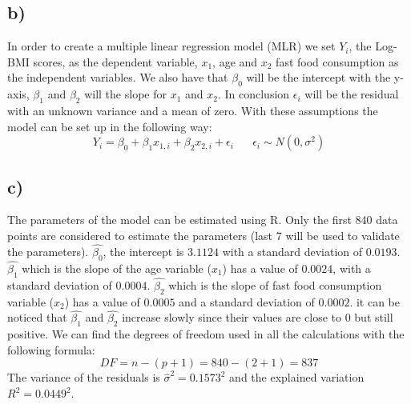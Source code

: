 \begin{figure}[ht!]
\begin{minipage}{.5\textwidth}
  \label{ScatLogFast}
\end{minipage}
\end{figure}

\subsection{b)}
In order to create a multiple linear regression model (MLR)
we set $Y_i$, the Log-BMI scores, as the dependent variable, $x_1$, age and $x_2$ fast food consumption as the independent variables. We also have that $\beta_0$ will be the intercept with the y-axis, $\beta_1$ and $\beta_2$ will the slope for $x_1$ and $x_2$. In conclusion $\epsilon_i$ will be the residual with an unknown variance and a mean of zero. With these assumptions the model can be set up in the following way:
\[ Y_i=\beta_0 +\beta_1 x_{1,i} + \beta_2 x_{2,i}+ \epsilon_i \; \; \; \; \; \; \epsilon_i \sim N(0,\sigma^2)\]

\subsection{c)}
The parameters of the model can be estimated using R. Only the first 840 data points are considered to estimate the parameters (last 7 will be used to validate the parameters). $\hat{\beta_0}$, the intercept is $3.1124$ with a standard deviation of $0.0193$. $\hat{\beta_1}$ which is the slope of the age variable ($x_1$) has a value of $0.0024$, with a standard deviation of $0.0004$. $\hat{\beta_2}$ which is the slope of fast food consumption variable ($x_2$) has a value of $0.0005$ and a standard deviation of $0.0002$. it can be noticed that $\hat{\beta_1}$ and $\hat{\beta_2}$ increase slowly since their values are close to 0 but still positive. We can find the degrees of freedom used in all the calculations with the following formula: 
\begin{equation}\label{dof}
    DF=n-(p+1)=840-(2+1)=837
\end{equation}
The variance of the residuals is $\hat{\sigma}^2=0.1573^2$ and the explained variation $R^2=0.0449^2$.


